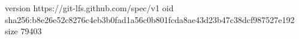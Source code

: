 version https://git-lfs.github.com/spec/v1
oid sha256:b8e26e52c8276c4eb3b0fad1a56c0b801fcda8ae43d23b47c38dcf987527e192
size 79403
